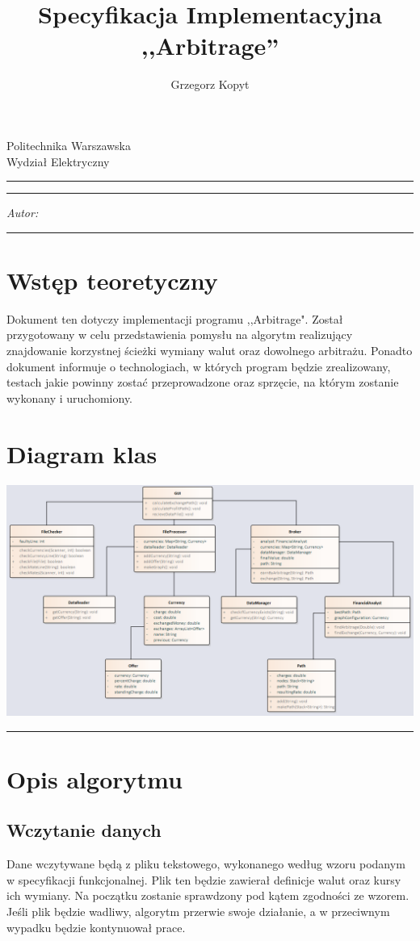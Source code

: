\documentclass[a4paper,11pt]{article}
\author{Grzegorz Kopyt}
\title{Specyfikacja Implementacyjna \\
,,Arbitrage''}
\makeatletter
\newcommand{\linia}{\rule{\linewidth}{0.4mm}}
\renewcommand{\maketitle}{\begin{titlepage}
    \vspace*{2cm}
    \begin{center}\LARGE
    Politechnika Warszawska\\
    Wydział Elektryczny\\
    \end{center}
    \vspace{5cm}
    \noindent\linia
    \begin{center}
      \LARGE \textsc{\@title}
         \end{center}
     \linia
    \vspace{0.5cm}
    \begin{flushright}
    \begin{minipage}{5cm}
    \textit{Autor:}\\
    \normalsize \textsc{\@author} \par
    \end{minipage}
    \vspace{5cm}
     \end{flushright}
    \vspace*{\stretch{6}}
    \begin{center}
    \@date
    \end{center}
  \end{titlepage}
}
\makeatother
\begin{document}
\maketitle

\tableofcontents
\vspace{1cm}
\noindent\linia

\section{Wstęp teoretyczny}
Dokument ten dotyczy implementacji programu ,,Arbitrage". Został przygotowany w celu przedstawienia pomysłu na algorytm realizujący znajdowanie korzystnej ścieżki wymiany walut oraz dowolnego arbitrażu. Ponadto dokument informuje o technologiach, w których program będzie zrealizowany, testach jakie powinny zostać przeprowadzone oraz sprzęcie, na którym zostanie wykonany i uruchomiony.
\section{Diagram klas}
\begin{center}
\includegraphics[width = 19cm]{DiagramKlas}
\end{center}

\noindent\linia
\section{Opis algorytmu}

\subsection{Wczytanie danych}

Dane wczytywane będą z pliku tekstowego, wykonanego według wzoru podanym w specyfikacji funkcjonalnej. Plik ten będzie zawierał definicje walut oraz kursy ich wymiany. Na początku zostanie sprawdzony pod kątem zgodności ze wzorem. Jeśli plik będzie wadliwy, algorytm przerwie swoje działanie, a w przeciwnym wypadku będzie kontynuował prace.
\end{document}
